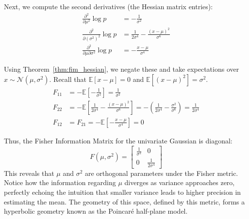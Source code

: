 Next, we compute the second derivatives (the Hessian matrix entries):
\begin{align*}
    \frac{\partial^2}{\partial \mu^2} \log p &= -\frac{1}{\sigma^2} \\
    \frac{\partial^2}{\partial (\sigma^2)^2} \log p &= \frac{1}{2\sigma^4} - \frac{(x-\mu)^2}{\sigma^6} \\
    \frac{\partial^2}{\partial \mu \partial \sigma^2} \log p &= -\frac{x-\mu}{\sigma^4}
\end{align*}

Using Theorem~\ref{thm:fim_hessian}, we negate these and take expectations over $x \sim \mathcal{N}(\mu, \sigma^2)$. Recall that $\mathbb{E}[x-\mu] = 0$ and $\mathbb{E}[(x-\mu)^2] = \sigma^2$.
\begin{align*}
    F_{11} &= -\mathbb{E}\left[ -\frac{1}{\sigma^2} \right] = \frac{1}{\sigma^2} \\
    F_{22} &= -\mathbb{E}\left[ \frac{1}{2\sigma^4} - \frac{(x-\mu)^2}{\sigma^6} \right] = -\left( \frac{1}{2\sigma^4} - \frac{\sigma^2}{\sigma^6} \right) = \frac{1}{2\sigma^4} \\
    F_{12} &= F_{21} = -\mathbb{E}\left[ -\frac{x-\mu}{\sigma^4} \right] = 0
\end{align*}

Thus, the Fisher Information Matrix for the univariate Gaussian is diagonal:
\begin{equation}
    F(\mu, \sigma^2) = \begin{bmatrix}
        \frac{1}{\sigma^2} & 0 \\
        0 & \frac{1}{2\sigma^4}
    \end{bmatrix}
\end{equation}
This reveals that $\mu$ and $\sigma^2$ are orthogonal parameters under the Fisher metric. Notice how the information regarding $\mu$ diverges as variance approaches zero, perfectly echoing the intuition that smaller variance leads to higher precision in estimating the mean. The geometry of this space, defined by this metric, forms a hyperbolic geometry known as the Poincaré half-plane model.

